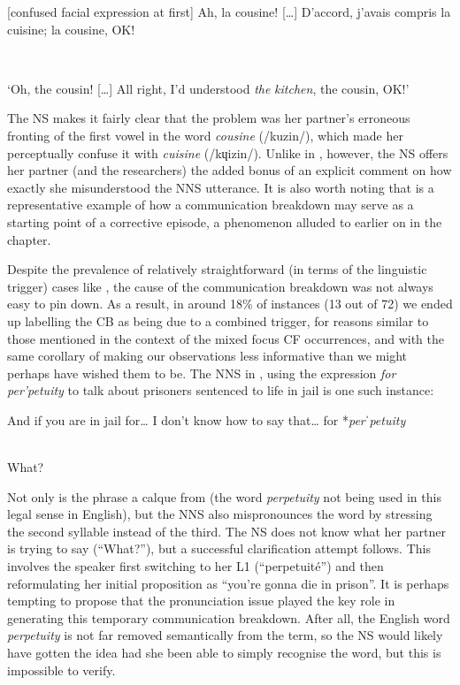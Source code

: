 \documentclass[output=paper,colorlinks,citecolor=brown,modfonts,nonflat]{../langscibook}
\begin{document}
{\NS} \parbox[t]{10cm}{[confused facial expression at first] {Ah,} {la} {cousine!} {[…]} {D'accord,} {j'avais} {compris} la cuisine{;} {la} {cousine,} {OK!}}\\\smallskip
{\TRS} \parbox[t]{10cm}{‘Oh, the cousin! […] All right, I’d understood \textit{the} \textit{kitchen}, the cousin, OK!’}
\z

The NS makes it fairly clear that the problem was her partner’s erroneous fronting of the first vowel in the word \textit{cousine} (/kuzin/), which made her perceptually confuse it with \textit{cuisine} (/kɥizin/). Unlike in , however, the NS offers her partner (and the researchers) the added bonus of an explicit comment on how exactly she misunderstood the NNS utterance. It is also worth noting that  is a representative example of how a communication breakdown may serve as a starting point of a corrective episode, a phenomenon alluded to earlier on in the chapter.

Despite the prevalence of relatively straightforward (in terms of the linguistic trigger) cases like , the cause of the communication breakdown was not always easy to pin down. As a result, in around 18\% of instances (13 out of 72) we ended up labelling the CB as being due to a combined trigger, for reasons similar to those mentioned in the context of the mixed focus CF occurrences, and with the same corollary of making our observations less informative than we might perhaps have wished them to be. The NNS in , using the expression \textit{for} \textit{per'petuity} to talk about prisoners sentenced to life in jail is one such instance:

\ea\label{ex:scheuer:19}
{\NNS} \parbox[t]{11cm}{{And} {if} {you} {are} {in} {jail} {for…} {I} {don’t} {know} {how} {to} {say} {that…} {for} *\textit{perˈpetuity}}\\\smallskip
{\NS} {What?}
\z

Not only is the phrase a calque from  (the word \textit{perpetuity} not being used in this legal sense in English), but the NNS also mispronounces the word by stressing the second syllable instead of the third. The NS does not know what her partner is trying to say (“What?”), but a successful clarification attempt follows. This involves the  speaker first switching to her L1 (“perpetuité”) and then reformulating her initial proposition as “you’re gonna die in prison”. It is perhaps tempting to propose that the pronunciation issue played the key role in generating this temporary communication breakdown. After all, the English word \textit{perpetuity} is not far removed semantically from the  term, so the NS would likely have gotten the idea had she been able to simply recognise the word, but this is impossible to verify.
\end{document}
